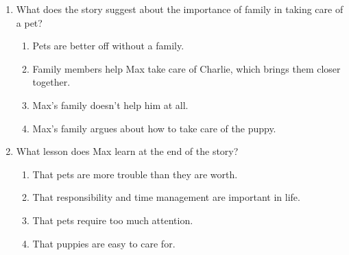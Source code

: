\documentclass[12pt]{article}
\begin{document}
\begin{enumerate}
    \item What does the story suggest about the importance of family in taking care of a pet?
    \begin{enumerate}[label=\Alph*.]
        \item Pets are better off without a family.
        \item Family members help Max take care of Charlie, which brings them closer together.
        \item Max's family doesn’t help him at all.
        \item Max’s family argues about how to take care of the puppy.
    \end{enumerate}
    \vspace{0.5cm}

    \item What lesson does Max learn at the end of the story?
    \begin{enumerate}[label=\Alph*.]
        \item That pets are more trouble than they are worth.
        \item That responsibility and time management are important in life.
        \item That pets require too much attention.
        \item That puppies are easy to care for.
    \end{enumerate}

\end{enumerate}
\end{document}
